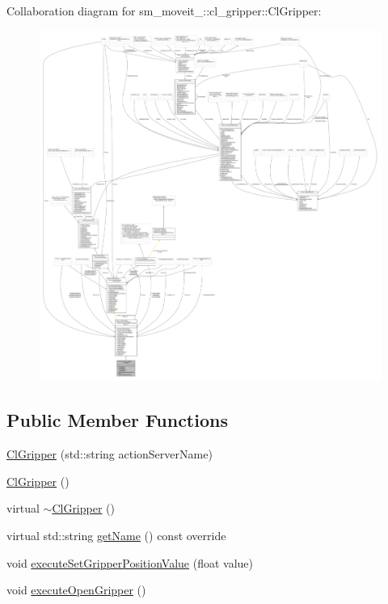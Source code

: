 Collaboration diagram for sm\+\_\+moveit\+\_\+:\+:cl\+\_\+gripper\+:\+:Cl\+Gripper\+:
\nopagebreak
\begin{figure}[H]
\begin{center}
\leavevmode
\includegraphics[width=350pt]{classsm__moveit__3_1_1cl__gripper_1_1ClGripper__coll__graph}
\end{center}
\end{figure}
\subsection*{Public Member Functions}
\begin{DoxyCompactItemize}
\item 
\hyperlink{classsm__moveit__3_1_1cl__gripper_1_1ClGripper_af6559b86085a61cf9c6aa52ab7c3ff3a}{Cl\+Gripper} (std\+::string action\+Server\+Name)
\item 
\hyperlink{classsm__moveit__3_1_1cl__gripper_1_1ClGripper_a3189c353282c26cb4b6451dde4e4a0de}{Cl\+Gripper} ()
\item 
virtual \hyperlink{classsm__moveit__3_1_1cl__gripper_1_1ClGripper_aca32ed915e44a98496adb008833ae786}{$\sim$\+Cl\+Gripper} ()
\item 
virtual std\+::string \hyperlink{classsm__moveit__3_1_1cl__gripper_1_1ClGripper_aa3ed6530f95ef8ce74f817f30e70b1b9}{get\+Name} () const override
\item 
void \hyperlink{classsm__moveit__3_1_1cl__gripper_1_1ClGripper_a50850d3a6511566da35dbbf7557e5590}{execute\+Set\+Gripper\+Position\+Value} (float value)
\item 
void \hyperlink{classsm__moveit__3_1_1cl__gripper_1_1ClGripper_ae1d30eaf3af0b2e017903730ff212d70}{execute\+Open\+Gripper} ()
\end{DoxyCompactItemize}
